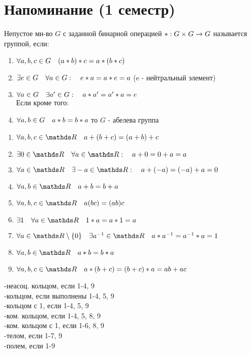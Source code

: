 \documentclass[algebra]{subfiles}
\begin{document}
    \section{Напоминание (1 семестр)}

    \begin{definition}
        Непустое мн-во $G$ с заданной бинарной операцией $*: G \times G \rightarrow G$ называется группой, если:
        \begin{enumerate}
            \item $\forall a,b,c \in G \quad (a*b)*c = a*(b*c)$
            \item $\exists e \in G \quad \forall a \in G: \quad e*a = a*e = a$ (e - нейтральный элемент)
            \item $\forall a \in G \quad \exists a' \in G: \quad a*a' = a'*a = e$\\
            Если кроме того:
            \item $\forall a, b \in G \quad a*b = b*a$
            то $G$ - абелева группа
        \end{enumerate}
    \end{definition}

    \begin{definition}
        \begin{enumerate}
          \item $\forall a,b,c \in \R \q a+(b+c) = (a+b)+c$
          \item $\e 0 \in \R \q \forall a \in \R: \q a+0 = 0+a = a$
          \item $\forall a \in \R \q \e -a \in \R: \q a+(-a) = (-a)+a = 0$
          \item $\forall a,b \in \R \q a+b = b+a$
          \item $\forall a,b,c \in \R \q a(bc) = (ab)c$
          \item $\e 1 \q \forall a \in \R \q 1*a = a*1 = a$
          \item $\forall a \in \R \setminus \{0\} \q \e a^{-1} \in \R \q a*a^{-1} = a^{-1}*a = 1$
          \item $\forall a,b \in \R \q a * b = b*a$
          \item $\forall a,b,c \in \R \q a*(b+c) = (b+c)*a = ab + ac$
        \end{enumerate}
        \begin{definition}
            -неасоц. кольцом, если 1-4, 9\\
            -кольцом, если выполнены 1-4, 5, 9\\
            -кольцом с 1, если 1-4, 5, 9\\
            -ком. кольцом, если 1-4, 5, 8, 9\\
            -ком. кольцом с 1, если 1-6, 8, 9\\
            -телом, если 1-7, 9\\
            -полем, если 1-9
        \end{definition}
    \end{definition}
\end{document}
